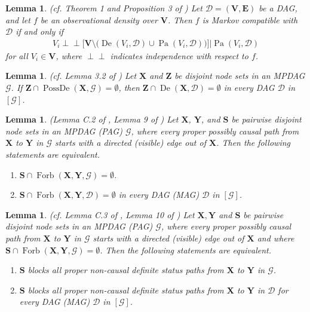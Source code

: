 \documentclass[twoside]{article}
\newtheorem{lemma}[theorem]{Lemma}
\DeclareMathOperator{\Pa}{Pa}
\DeclareMathOperator{\De}{De}
\DeclareMathOperator{\PossDe}{PossDe}
\DeclareMathOperator{\Forb}{Forb}
\newcommand{\fb}[2][X,Y]{\Forb(\mb{#1},#2)}
\newcommand{\mb}[1]{\mathbf{#1}}
\newcommand{\g}[1][G]{\mathcal{#1}}
\newcommand{\ind}{\perp\!\!\!\!\perp}
\begin{document}
\begin{lemma} 
\label{lem:markov-equiv}  
{\normalfont (cf. Theorem 1 and Proposition 3 of \citealp{lauritzen1990independence})}
    Let $\g[D] = (\mb{V},\mb{E})$ be a DAG, and let $f$ be an observational density over $\mb{V}$. Then $f$ is Markov compatible with $\g[D]$ if and only if 
    \begin{align*}
        V_i \ind \Big[ \mb{V} \setminus \big( \De(V_i, \g[D]) \cup \Pa(V_i,\g[D]) \big) \Big] | \Pa(V_i, \g[D])
    \end{align*}
    for all $V_i \in \mb{V}$, where $\ind$ indicates independence with respect to $f$.
\end{lemma}




\begin{lemma}
\label{lem:equiv-z-mpdag} 
{\normalfont (cf. Lemma 3.2 of \citealp{perkovic2017interpreting})}
    Let $\mb{X}$ and $\mb{Z}$ be disjoint node sets in an MPDAG $\g$. If $\mb{Z} \cap \PossDe(\mb{X},\g) = \emptyset$, then $\mb{Z} \cap \De(\mb{X},\g[D]) = \emptyset$ in every DAG $\g[D]$ in $[\g]$.
\end{lemma}


\begin{lemma}
\label{lem:equiv-forb}
{\normalfont (Lemma C.2 of \citealp{perkovic2017interpreting}, Lemma 9 of \citealp{perkovic2018complete})}
    Let $\mb{X}$, $\mb{Y}$, and $\mb{S}$ be pairwise disjoint node sets in an MPDAG (PAG) $\g$, where every proper possibly causal path from $\mb{X}$ to $\mb{Y}$ in $\g$ starts with a directed (visible) edge out of $\mb{X}$. Then the following statements are equivalent.
    \begin{enumerate}[label = (\roman*)]
        \item $\mb{S} \cap \fb{\g} = \emptyset$.
        \item $\mb{S} \cap \fb{\g[D]} = \emptyset$ in every DAG (MAG) $\g[D]$ in $[\g]$.
    \end{enumerate}
\end{lemma}


\begin{lemma}
\label{lem:equiv-block} 
{\normalfont (cf. Lemma C.3 of \citealp{perkovic2017interpreting}, Lemma 10 of \citealp{perkovic2018complete})}
    Let $\mb{X,Y}$ and $\mb{S}$ be pairwise disjoint node sets in an MPDAG (PAG) $\g$, where every proper possibly causal path from $\mb{X}$ to $\mb{Y}$ in $\g$ starts with a directed (visible) edge out of $\mb{X}$ and where $\mb{S} \cap \fb{\g} = \emptyset$. Then the following statements are equivalent.
    \begin{enumerate}[label = (\roman*)]
        \item $\mb{S}$ blocks all proper non-causal definite status paths from $\mb{X}$ to $\mb{Y}$ in $\g$.
        \item $\mb{S}$ blocks all proper non-causal definite status paths from $\mb{X}$ to $\mb{Y}$ in $\g[D]$ for every DAG (MAG) $\g[D]$ in $[\g]$.
    \end{enumerate}
\end{lemma}
\end{document}
